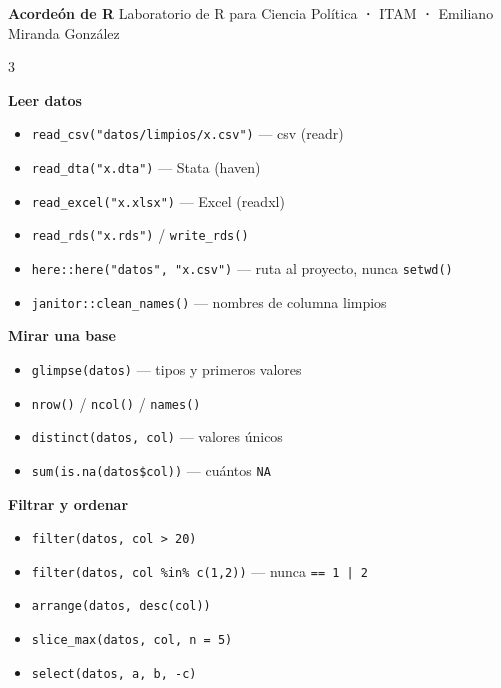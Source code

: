 \documentclass[9pt]{extarticle}
\newcommand{\tarea}[1]{%
  \par\vspace{8pt}%
  \noindent\colorbox{verdeITAM}{\parbox[c][14pt]{\dimexpr\linewidth-2\fboxsep\relax}{\hspace{2pt}\color{white}\bfseries\fontsize{9.3}{10}\selectfont #1}}%
  \par\vspace{4pt}%
}
\newcommand{\co}[1]{\texttt{\color{verdeProfundo}#1}}
\begin{document}
\fontsize{9}{10.3}\selectfont

\begin{center}
  {\color{verdeProfundo}\bfseries\fontsize{13}{13}\selectfont Acordeón de R}\quad
  {\color{grisTexto}\fontsize{8}{8}\selectfont Laboratorio de R para Ciencia Política \textbf{·} ITAM \textbf{·} Emiliano Miranda González}
\end{center}
\vspace{-4pt}
\noindent{\color{verdeITAM}\rule{\linewidth}{1pt}}
\vspace{2pt}

\begin{multicols}{3}


\tarea{Leer datos}
\begin{itemize}
  \item \co{read\_csv("datos/limpios/x.csv")} --- csv (readr)
  \item \co{read\_dta("x.dta")} --- Stata (haven)
  \item \co{read\_excel("x.xlsx")} --- Excel (readxl)
  \item \co{read\_rds("x.rds")} / \co{write\_rds()}
  \item \co{here::here("datos", "x.csv")} --- ruta al proyecto, nunca \co{setwd()}
  \item \co{janitor::clean\_names()} --- nombres de columna limpios
\end{itemize}

\tarea{Mirar una base}
\begin{itemize}
  \item \co{glimpse(datos)} --- tipos y primeros valores
  \item \co{nrow()} / \co{ncol()} / \co{names()}
  \item \co{distinct(datos, col)} --- valores únicos
  \item \co{sum(is.na(datos\$col))} --- cuántos \co{NA}
\end{itemize}

\tarea{Filtrar y ordenar}
\begin{itemize}
  \item \co{filter(datos, col > 20)}
  \item \co{filter(datos, col \%in\% c(1,2))} --- nunca \co{== 1 | 2}
  \item \co{arrange(datos, desc(col))}
  \item \co{slice\_max(datos, col, n = 5)}
  \item \co{select(datos, a, b, -c)}
\end{itemize}


\end{multicols}
\end{document}

